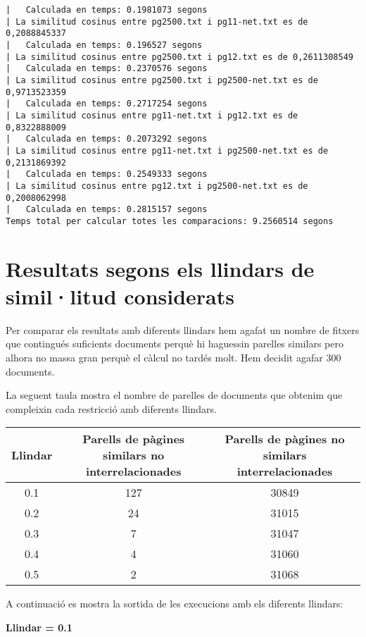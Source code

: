 \documentclass{report}
\begin{document}
\begin{verbatim}
|	Calculada en temps: 0.1981073 segons
| La similitud cosinus entre pg2500.txt i pg11-net.txt es de 0,2088845337
|	Calculada en temps: 0.196527 segons
| La similitud cosinus entre pg2500.txt i pg12.txt es de 0,2611308549
|	Calculada en temps: 0.2370576 segons
| La similitud cosinus entre pg2500.txt i pg2500-net.txt es de 0,9713523359
|	Calculada en temps: 0.2717254 segons
| La similitud cosinus entre pg11-net.txt i pg12.txt es de 0,8322888009
|	Calculada en temps: 0.2073292 segons
| La similitud cosinus entre pg11-net.txt i pg2500-net.txt es de 0,2131869392
|	Calculada en temps: 0.2549333 segons
| La similitud cosinus entre pg12.txt i pg2500-net.txt es de 0,2008062998
|	Calculada en temps: 0.2815157 segons
Temps total per calcular totes les comparacions: 9.2560514 segons

\end{verbatim}

\newpage

\section{Resultats segons els llindars de simil·litud considerats}

Per comparar els resultats amb diferents llindars hem agafat un nombre de fitxers que contingués suficients documents perquè hi haguessin parelles similars pero alhora no massa gran perquè el càlcul no tardés molt. Hem decidit agafar 300 documents.

La seguent taula mostra el nombre de parelles de documents que obtenim que compleixin cada restricció amb diferents llindars.


\begin{center}
    \begin{tabular}{| c | c | c |}
    \hline
    Llindar & Parells de pàgines similars no interrelacionades & Parells de pàgines no similars interrelacionades \\ \hline
    0.1 & 127 & 30849 \\ \hline
    0.2 & 24  & 31015 \\ \hline
    0.3 & 7   & 31047 \\ \hline
    0.4 & 4   & 31060 \\ \hline
    0.5 & 2   & 31068 \\
    \hline
    \end{tabular}
\end{center}

A continuació es mostra la sortida de les execucions amb els diferents llindars:
\newline
\newline
\centerline{ \textbf{Llindar = 0.1} }
\end{document}
